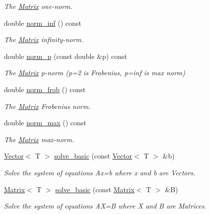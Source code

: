 \begin{DoxyCompactItemize}
\begin{DoxyCompactList}\small\item\em The \hyperlink{classLuna_1_1Matrix}{Matrix} one-\/norm. \end{DoxyCompactList}\item 
double \hyperlink{classLuna_1_1Matrix_a9fb259d76d733da0bb722efe9ce9bcd2}{norm\+\_\+inf} () const
\begin{DoxyCompactList}\small\item\em The \hyperlink{classLuna_1_1Matrix}{Matrix} infinity-\/norm. \end{DoxyCompactList}\item 
double \hyperlink{classLuna_1_1Matrix_a95e7a5a0afb0abb419c4cfb8e1c27b57}{norm\+\_\+p} (const double \&p) const
\begin{DoxyCompactList}\small\item\em The \hyperlink{classLuna_1_1Matrix}{Matrix} p-\/norm (p=2 is Frobenius, p=inf is max norm) \end{DoxyCompactList}\item 
double \hyperlink{classLuna_1_1Matrix_a5c760c22fd59b5cb21a81ccb8468b6c2}{norm\+\_\+frob} () const
\begin{DoxyCompactList}\small\item\em The \hyperlink{classLuna_1_1Matrix}{Matrix} Frobenius norm. \end{DoxyCompactList}\item 
double \hyperlink{classLuna_1_1Matrix_a1db72e57e9efbd1de2c34ea405184292}{norm\+\_\+max} () const
\begin{DoxyCompactList}\small\item\em The \hyperlink{classLuna_1_1Matrix}{Matrix} max-\/norm. \end{DoxyCompactList}\item 
\hyperlink{classLuna_1_1Vector}{Vector}$<$ T $>$ \hyperlink{classLuna_1_1Matrix_ae4bc0746bf6780696ef7b40a56c7ce4a}{solve\+\_\+basic} (const \hyperlink{classLuna_1_1Vector}{Vector}$<$ T $>$ \&b)
\begin{DoxyCompactList}\small\item\em Solve the system of equations Ax=b where x and b are Vectors. \end{DoxyCompactList}\item 
\hyperlink{classLuna_1_1Matrix}{Matrix}$<$ T $>$ \hyperlink{classLuna_1_1Matrix_a986975f00bf3ebbf0b298887e2f1d7f6}{solve\+\_\+basic} (const \hyperlink{classLuna_1_1Matrix}{Matrix}$<$ T $>$ \&B)
\begin{DoxyCompactList}\small\item\em Solve the system of equations AX=B where X and B are Matrices. \end{DoxyCompactList}\item 

\end{DoxyCompactItemize}
